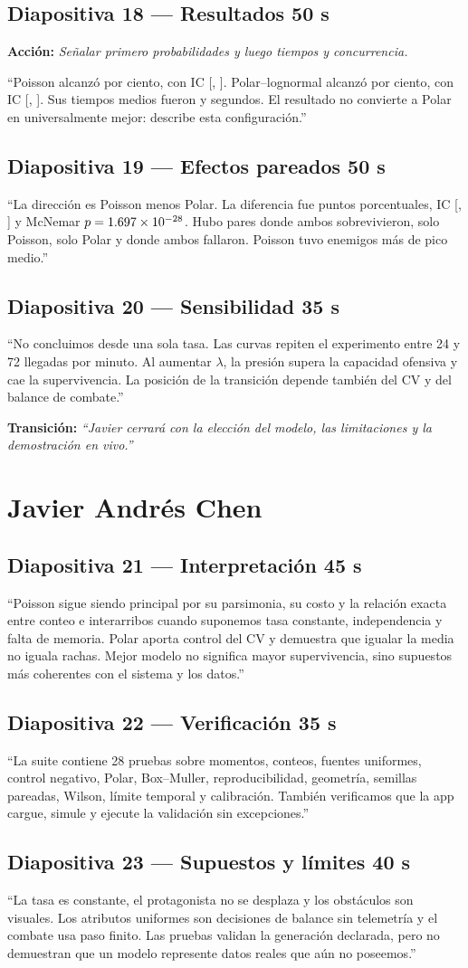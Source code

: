\documentclass[11pt,a4paper]{article}
\newcommand{\slidecue}[4]{%
  \subsection*{\textcolor{outbreakgreen}{Diapositiva #1 --- #2}\hfill
  \normalfont\small #3}
  \noindent\colorbox{outbreakpale}{\parbox{\dimexpr\textwidth-2\fboxsep}{#4}}
  \vspace{0.45em}}
\newcommand{\stage}[1]{\textbf{\textcolor{outbreakamber}{Acción:}} \emph{#1}\par}
\newcommand{\handoff}[1]{\vspace{0.4em}\textbf{Transición:} \emph{#1}\par}
\begin{document}
\slidecue{18}{Resultados}{50 s}{
\stage{Señalar primero probabilidades y luego tiempos y concurrencia.}
``Poisson alcanzó \PoissonSurvival{} por ciento, con IC
[\PoissonCILow, \PoissonCIHigh]. Polar--lognormal alcanzó
\PolarSurvival{} por ciento, con IC [\PolarCILow, \PolarCIHigh]. Sus tiempos
medios fueron \PoissonMeanTime{} y \PolarMeanTime{} segundos. El resultado no
convierte a Polar en universalmente mejor: describe esta configuración.''
}

\slidecue{19}{Efectos pareados}{50 s}{
``La dirección es Poisson menos Polar. La diferencia fue
\SurvivalDifference{} puntos porcentuales, IC
[\SurvivalDiffLow, \SurvivalDiffHigh] y McNemar $p=1.697\times 10^{-28}$. Hubo
\BothSurvive{} pares donde ambos sobrevivieron, \OnlyPoisson{} solo Poisson,
\OnlyPolar{} solo Polar y \BothFail{} donde ambos fallaron. Poisson tuvo
\PeakDifference{} enemigos más de pico medio.''
}

\slidecue{20}{Sensibilidad}{35 s}{
``No concluimos desde una sola tasa. Las curvas repiten el experimento entre 24
y 72 llegadas por minuto. Al aumentar $\lambda$, la presión supera la capacidad
ofensiva y cae la supervivencia. La posición de la transición depende también
del CV y del balance de combate.''
}

\handoff{``Javier cerrará con la elección del modelo, las limitaciones y la
demostración en vivo.''}

\newpage
\section{Javier Andrés Chen}

\slidecue{21}{Interpretación}{45 s}{
``Poisson sigue siendo principal por su parsimonia, su costo y la relación
exacta entre conteo e interarribos cuando suponemos tasa constante,
independencia y falta de memoria. Polar aporta control del CV y demuestra que
igualar la media no iguala rachas. Mejor modelo no significa mayor
supervivencia, sino supuestos más coherentes con el sistema y los datos.''
}

\slidecue{22}{Verificación}{35 s}{
``La suite contiene 28 pruebas sobre momentos, conteos, fuentes uniformes,
control negativo, Polar, Box--Muller, reproducibilidad, geometría, semillas
pareadas, Wilson, límite temporal y calibración. También verificamos que la app
cargue, simule y ejecute la validación sin excepciones.''
}

\slidecue{23}{Supuestos y límites}{40 s}{
``La tasa es constante, el protagonista no se desplaza y los obstáculos son
visuales. Los atributos uniformes son decisiones de balance sin telemetría y
el combate usa paso finito. Las pruebas validan la generación declarada, pero
no demuestran que un modelo represente datos reales que aún no poseemos.''
}
\end{document}
